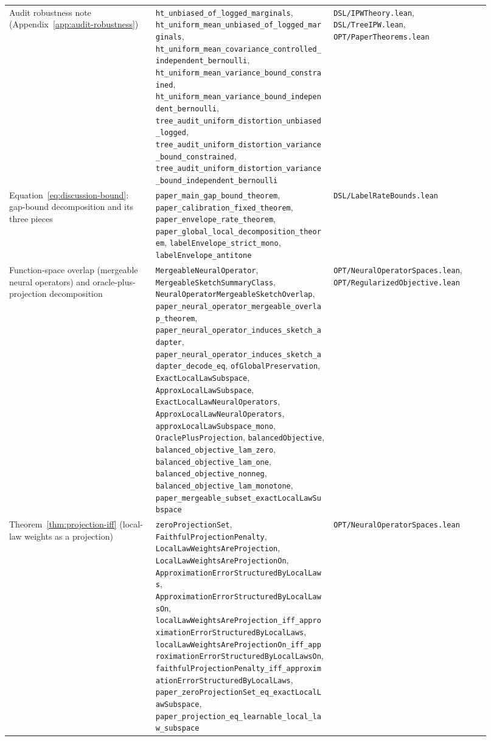 {\begin{longtable}{p{0.28\linewidth}p{0.34\linewidth}p{0.30\linewidth}}
Audit robustness note (Appendix~\ref{app:audit-robustness}) &
\texttt{ht\_unbiased\_of\_logged\_marginals}, \texttt{ht\_uniform\_mean\_unbiased\_of\_logged\_marginals}, \texttt{ht\_uniform\_mean\_covariance\_controlled\_independent\_bernoulli}, \texttt{ht\_uniform\_mean\_variance\_bound\_constrained}, \texttt{ht\_uniform\_mean\_variance\_bound\_independent\_bernoulli}, \texttt{tree\_audit\_uniform\_distortion\_unbiased\_logged}, \texttt{tree\_audit\_uniform\_distortion\_variance\_bound\_constrained}, \texttt{tree\_audit\_uniform\_distortion\_variance\_bound\_independent\_bernoulli} &
\texttt{DSL/IPWTheory.lean}, \texttt{DSL/TreeIPW.lean}, \texttt{OPT/PaperTheorems.lean} \\

Equation~\eqref{eq:discussion-bound}: gap-bound decomposition and its three pieces &
\texttt{paper\_main\_gap\_bound\_theorem}, \texttt{paper\_calibration\_fixed\_theorem}, \texttt{paper\_envelope\_rate\_theorem}, \texttt{paper\_global\_local\_decomposition\_theorem}, \texttt{labelEnvelope\_strict\_mono}, \texttt{labelEnvelope\_antitone} &
\texttt{DSL/LabelRateBounds.lean} \\

Function-space overlap (mergeable neural operators) and oracle-plus-projection decomposition &
\texttt{MergeableNeuralOperator}, \texttt{MergeableSketchSummaryClass}, \texttt{NeuralOperatorMergeableSketchOverlap}, \texttt{paper\_neural\_operator\_mergeable\_overlap\_theorem}, \texttt{paper\_neural\_operator\_induces\_sketch\_adapter}, \texttt{paper\_neural\_operator\_induces\_sketch\_adapter\_decode\_eq}, \texttt{ofGlobalPreservation}, \texttt{ExactLocalLawSubspace}, \texttt{ApproxLocalLawSubspace}, \texttt{ExactLocalLawNeuralOperators}, \texttt{ApproxLocalLawNeuralOperators}, \texttt{approxLocalLawSubspace\_mono}, \texttt{OraclePlusProjection}, \texttt{balancedObjective}, \texttt{balanced\_objective\_lam\_zero}, \texttt{balanced\_objective\_lam\_one}, \texttt{balanced\_objective\_nonneg}, \texttt{balanced\_objective\_lam\_monotone}, \texttt{paper\_mergeable\_subset\_exactLocalLawSubspace} &
\texttt{OPT/NeuralOperatorSpaces.lean}, \texttt{OPT/RegularizedObjective.lean} \\

Theorem~\ref{thm:projection-iff} (local-law weights as a projection) &
\texttt{zeroProjectionSet}, \texttt{FaithfulProjectionPenalty}, \texttt{LocalLawWeightsAreProjection}, \texttt{LocalLawWeightsAreProjectionOn}, \texttt{ApproximationErrorStructuredByLocalLaws}, \texttt{ApproximationErrorStructuredByLocalLawsOn}, \texttt{localLawWeightsAreProjection\_iff\_approximationErrorStructuredByLocalLaws}, \texttt{localLawWeightsAreProjectionOn\_iff\_approximationErrorStructuredByLocalLawsOn}, \texttt{faithfulProjectionPenalty\_iff\_approximationErrorStructuredByLocalLaws}, \texttt{paper\_zeroProjectionSet\_eq\_exactLocalLawSubspace}, \texttt{paper\_projection\_eq\_learnable\_local\_law\_subspace} &
\texttt{OPT/NeuralOperatorSpaces.lean} \\
\end{longtable}
}

